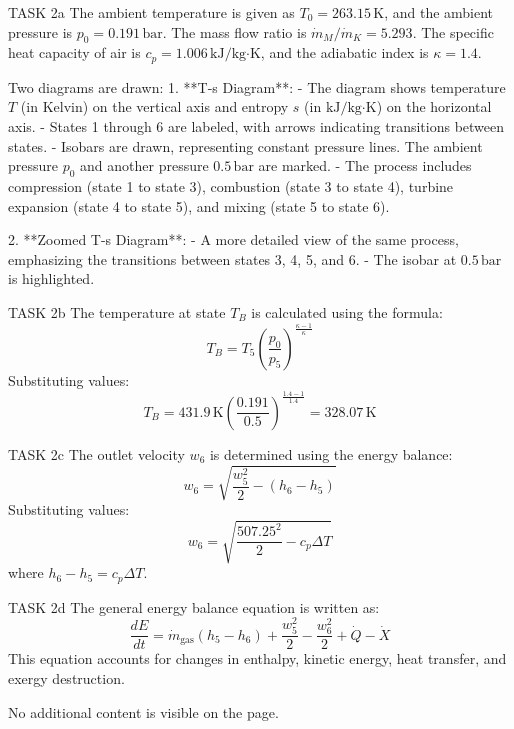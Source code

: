 TASK 2a  
The ambient temperature is given as \( T_0 = 263.15 \, \text{K} \), and the ambient pressure is \( p_0 = 0.191 \, \text{bar} \). The mass flow ratio is \( \dot{m}_M / \dot{m}_K = 5.293 \). The specific heat capacity of air is \( c_p = 1.006 \, \text{kJ/kg·K} \), and the adiabatic index is \( \kappa = 1.4 \).

Two diagrams are drawn:  
1. **T-s Diagram**:  
   - The diagram shows temperature \( T \) (in Kelvin) on the vertical axis and entropy \( s \) (in \( \text{kJ/kg·K} \)) on the horizontal axis.  
   - States 1 through 6 are labeled, with arrows indicating transitions between states.  
   - Isobars are drawn, representing constant pressure lines. The ambient pressure \( p_0 \) and another pressure \( 0.5 \, \text{bar} \) are marked.  
   - The process includes compression (state 1 to state 3), combustion (state 3 to state 4), turbine expansion (state 4 to state 5), and mixing (state 5 to state 6).  

2. **Zoomed T-s Diagram**:  
   - A more detailed view of the same process, emphasizing the transitions between states 3, 4, 5, and 6.  
   - The isobar at \( 0.5 \, \text{bar} \) is highlighted.  

TASK 2b  
The temperature at state \( T_B \) is calculated using the formula:  
\[
T_B = T_5 \left( \frac{p_0}{p_5} \right)^{\frac{\kappa - 1}{\kappa}}
\]  
Substituting values:  
\[
T_B = 431.9 \, \text{K} \left( \frac{0.191}{0.5} \right)^{\frac{1.4 - 1}{1.4}} = 328.07 \, \text{K}
\]

TASK 2c  
The outlet velocity \( w_6 \) is determined using the energy balance:  
\[
w_6 = \sqrt{\frac{w_5^2}{2} - (h_6 - h_5)}
\]  
Substituting values:  
\[
w_6 = \sqrt{\frac{507.25^2}{2} - c_p \Delta T}
\]  
where \( h_6 - h_5 = c_p \Delta T \).

TASK 2d  
The general energy balance equation is written as:  
\[
\frac{dE}{dt} = \dot{m}_{\text{gas}} (h_5 - h_6) + \frac{w_5^2}{2} - \frac{w_6^2}{2} + \dot{Q} - \dot{X}
\]  
This equation accounts for changes in enthalpy, kinetic energy, heat transfer, and exergy destruction.  

No additional content is visible on the page.